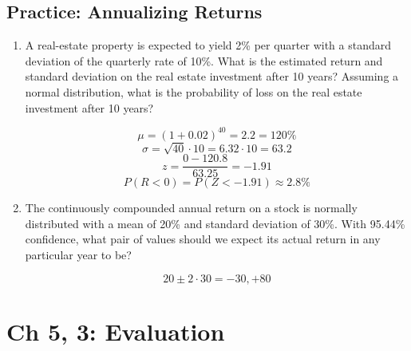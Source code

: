 \documentclass[11pt]{article}
\theoremstyle{definition}
\begin{document}
    \begin{shaded}
    \subsection{Practice: Annualizing Returns}
      \begin{enumerate}
      \setcounter{enumi}{0}
        \item A real-estate property is expected to yield 2\% per quarter with a 
        standard deviation of the quarterly rate of 10\%.  What is the estimated return and standard deviation on the real estate investment after 10 years?  Assuming a normal distribution, what is the probability of loss on the real estate investment after 10 years?

        $$\mu = (1+0.02)^{40} = 2.2 = 120\%$$
        $$\sigma = \sqrt{40}\cdot10 = 6.32\cdot10 = 63.2$$
        $$z=\frac{0-120.8}{63.25}=-1.91$$
        $$P(R<0)=P(Z<-1.91)\approx2.8\%$$
        
        \item The continuously compounded annual return on a stock is normally distributed with a mean of 20\% and standard deviation of 30\%.   With 95.44\% confidence, what pair of values should we expect its actual return in any particular year to be?

        $$20 \pm 2\cdot30 = -30,+80$$
        
      \end{enumerate}
    \end{shaded}

\section{ Ch 5, 3: Evaluation}
\end{document}
